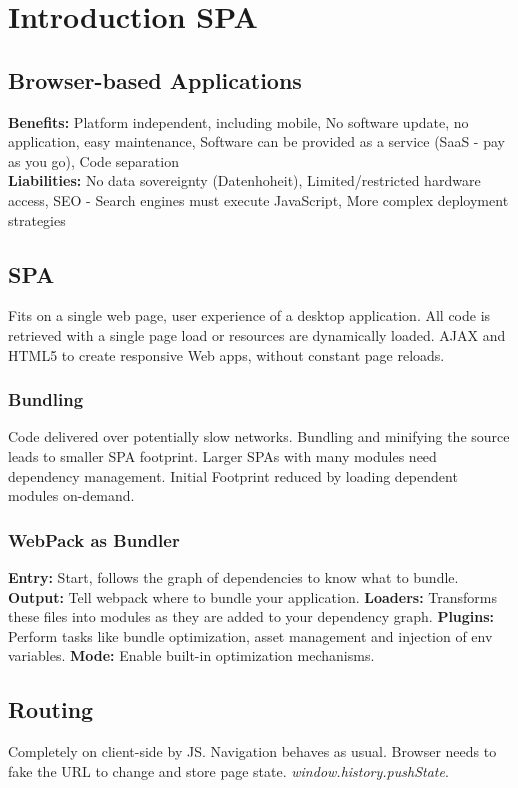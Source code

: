 
\section{Introduction SPA}
\subsection{Browser-based Applications}
\textbf{Benefits:} Platform independent, including mobile,
No software update, no application, easy maintenance, 
Software can be provided as a service (SaaS - pay as you go),
Code separation\\
\textbf{Liabilities:} No data sovereignty (Datenhoheit),
Limited/restricted hardware access,
SEO - Search engines must execute JavaScript,
More complex deployment strategies

\subsection{SPA}
Fits on a single web page, user experience of a desktop application.
All code is retrieved with a single page load or resources are dynamically loaded.
AJAX and HTML5 to create responsive Web apps, without constant page reloads.

\subsubsection{Bundling}
Code delivered over potentially slow networks.
Bundling and minifying the source leads to smaller SPA footprint.
Larger SPAs with many modules need dependency management.
Initial Footprint reduced by loading dependent modules on-demand.

\subsubsection{WebPack as Bundler}
\textbf{Entry:} Start, follows the graph of dependencies to know what to bundle.
\textbf{Output:} Tell webpack where to bundle your application.
\textbf{Loaders:} Transforms these files into modules as they are added to your dependency graph.
\textbf{Plugins:} Perform tasks like bundle optimization, asset management and injection of env variables.
\textbf{Mode:} Enable built-in optimization mechanisms.

\subsection{Routing}
Completely on client-side by JS. 
Navigation behaves as usual.
Browser needs to fake the URL to change and store page state.
\textit{window.history.pushState}.

